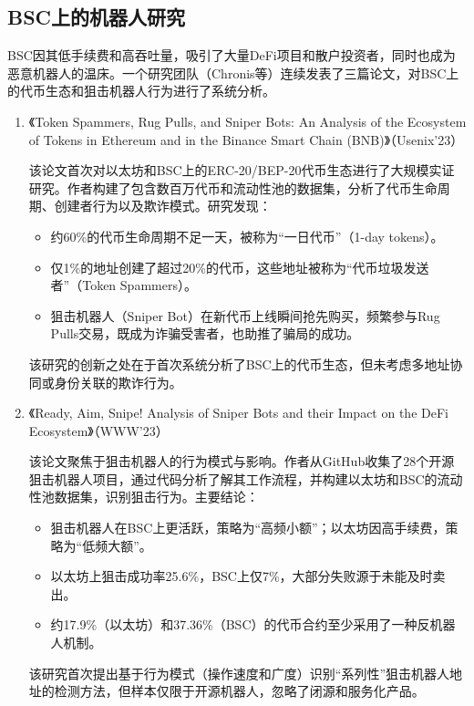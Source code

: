 \subsection{BSC上的机器人研究}
\par BSC因其低手续费和高吞吐量，吸引了大量DeFi项目和散户投资者，同时也成为恶意机器人的温床。一个研究团队（Chronis等）连续发表了三篇论文，对BSC上的代币生态和狙击机器人行为进行了系统分析。
\begin{enumerate}
    \item 《Token Spammers, Rug Pulls, and Sniper Bots: An Analysis of the Ecosystem of Tokens in Ethereum and in the Binance Smart Chain (BNB)》（Usenix’23）
    \par 该论文首次对以太坊和BSC上的ERC-20/BEP-20代币生态进行了大规模实证研究。作者构建了包含数百万代币和流动性池的数据集，分析了代币生命周期、创建者行为以及欺诈模式。研究发现：
	\begin{itemize}
  	    \item 约60\%的代币生命周期不足一天，被称为“一日代币”（1-day tokens）。
	    \item 仅1\%的地址创建了超过20\%的代币，这些地址被称为“代币垃圾发送者”（Token Spammers）。
             \item 狙击机器人（Sniper Bot）在新代币上线瞬间抢先购买，频繁参与Rug Pulls交易，既成为诈骗受害者，也助推了骗局的成功。
	\end{itemize}
    \par 该研究的创新之处在于首次系统分析了BSC上的代币生态，但未考虑多地址协同或身份关联的欺诈行为。
    \item 《Ready, Aim, Snipe! Analysis of Sniper Bots and their Impact on the DeFi Ecosystem》（WWW’23）
    \par 该论文聚焦于狙击机器人的行为模式与影响。作者从GitHub收集了28个开源狙击机器人项目，通过代码分析了解其工作流程，并构建以太坊和BSC的流动性池数据集，识别狙击行为。主要结论：
	\begin{itemize}
  	    \item 狙击机器人在BSC上更活跃，策略为“高频小额”；以太坊因高手续费，策略为“低频大额”。
	    \item 以太坊上狙击成功率25.6\%，BSC上仅7\%，大部分失败源于未能及时卖出。
             \item 约17.9\%（以太坊）和37.36\%（BSC）的代币合约至少采用了一种反机器人机制。
	\end{itemize}
    \par 该研究首次提出基于行为模式（操作速度和广度）识别“系列性”狙击机器人地址的检测方法，但样本仅限于开源机器人，忽略了闭源和服务化产品。

\end{enumerate}
